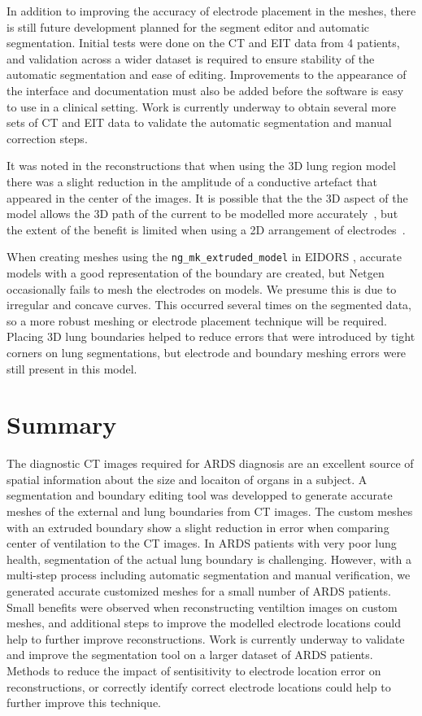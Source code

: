In addition to improving the accuracy of electrode placement in the meshes,
there is still future development 
planned for the segment editor and automatic segmentation. Initial tests were done on the CT and EIT data
from 4 patients, and validation across a wider dataset is required to ensure stability 
of the automatic segmentation and ease of editing. Improvements to the appearance of the interface and 
documentation must also be added before the software is easy to use in a clinical setting. 
Work is currently underway to obtain several more sets of CT and EIT data to validate the automatic 
segmentation and manual correction steps. 

It was noted in the reconstructions that when using the 3D lung region model there was a
slight reduction in the amplitude of a conductive artefact that appeared in the center of
the images. It is possible that the the 3D aspect of the model allows the 3D path of the current
to be modelled more accurately~\parencite{adler_electrical_2017}, but the 
extent of the benefit is limited when using a 2D arrangement of 
electrodes~\parencite{grychtol_3d_2016}.

When creating meshes using the \verb!ng_mk_extruded_model! in EIDORS \parencite{grychtol_fem_2013}, 
accurate models with a good representation of the boundary are created, but 
Netgen occasionally fails to mesh the electrodes on models. We presume this is 
due to irregular and concave curves.
This occurred several times on the segmented data, so a more robust meshing
or electrode placement technique will be required. Placing 3D lung boundaries helped to reduce 
errors that were introduced by tight corners on lung segmentations, but electrode and boundary meshing
errors were still present in this model. 

\section{Summary}

The diagnostic CT images required for ARDS diagnosis are an excellent source of spatial 
information about the size and locaiton of organs in a subject. 
A segmentation and boundary 
editing tool
was developped to generate accurate meshes of the external and lung
boundaries from CT images. 
The custom meshes with an extruded boundary show a slight reduction in error 
when comparing center of ventilation to the CT images.
In ARDS patients with very poor lung health, segmentation of the actual lung boundary is 
challenging. However, with a multi-step process including automatic segmentation and 
manual verification, we generated accurate customized meshes for 
a small number of ARDS patients. 
Small benefits were observed when reconstructing ventiltion images 
on custom meshes, and additional steps to improve the modelled electrode 
locations could help to further improve reconstructions. 
Work is currently underway to validate and improve the segmentation tool on 
a larger dataset of ARDS patients. 
Methods to reduce the impact of sentisitivity to electrode 
location error on reconstructions, or correctly identify 
correct electrode locations could help to further improve this technique. 

